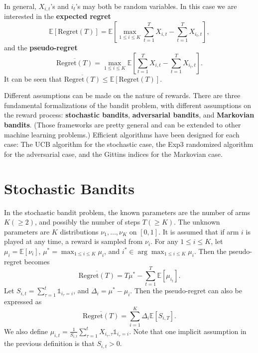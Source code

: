 \documentclass[openany]{book}
\theoremstyle{definition}
\theoremstyle{remark}
\begin{document}
In general, $X_{i,t}$'s and $i_t$'s may both be random variables. In this case we are interested in the \textbf{expected regret}
\begin{equation}\label{expectedRegret}
    \mathbb{E}[\mathrm{Regret}(T)]=\mathbb{E}\left[\max_{1\le i\le K}\sum_{t=1}^{T}X_{i,t}-\sum_{t=1}^{T}X_{i_t,t}\right],
\end{equation}
and the \textbf{pseudo-regret}
\begin{equation}\label{pseudoRegret}
    \overline{\mathrm{Regret}(T)}=\max_{1\le i\le K}\mathbb{E}\left[\sum_{t=1}^{T}X_{i,t}-\sum_{t=1}^{T}X_{i_t,t}\right].
\end{equation}
It can be seen that $\overline{\mathrm{Regret}(T)}\le \mathbb{E}[\mathrm{Regret}(T)]$.

Different assumptions can be made on the nature of rewards. There are three fundamental formalizations of the bandit problem, with different assumptions on the reward process: \textbf{stochastic bandits}, \textbf{adversarial bandits}, and \textbf{Markovian bandits}. (Those frameworks are pretty general and can be extended to other machine learning problems.) Efficient algorithms have been designed for each case: The UCB algorithm for the stochastic case, the Exp3 randomized algorithm for the adversarial case, and the Gittins indices for the Markovian case.

\chapter{Stochastic Bandits}
In the stochastic bandit problem, the known parameters are the number of arms $K(\ge2)$, and possibly the number of steps $T(\ge K)$. The unknown parameters are $K$ distributions $\nu_1,\ldots,\nu_K$ on $[0,1]$. It is assumed that if arm $i$ is played at any time, a reward is sampled from $\nu_i$. For any $1\le i\le K$, let $\mu_i=\mathbb{E}[\nu_i]$, $\mu^*=\max_{1\le i\le K}\mu_i$, and $i^*\in\arg\max_{1\le i\le K}\mu_i$. Then the pseudo-regret becomes
\begin{equation}\label{stochPseudoRegret}
    \overline{\mathrm{Regret}(T)}=T\mu^*-\sum_{t=1}^{T}\mathbb{E}[\mu_{i_t}].
\end{equation}
Let $S_{i,t}=\sum_{\tau=1}^{t}\mathds{1}_{i_{\tau}=i}$, and $\Delta_i=\mu^*-\mu_i$. Then the pseudo-regret can also be expressed as
\begin{equation}\label{stochPseudoRegretAlt}
    \overline{\mathrm{Regret}(T)}=\sum_{i=1}^{K}\Delta_i \mathbb{E}[S_{i,T}].
\end{equation}
We also define $\mu_{i,t}=\frac{1}{S_{i,t}}\sum_{\tau=1}^{t}X_{i_{\tau},\tau}\mathds{1}_{i_{\tau}=i}$. Note that one implicit assumption in the previous definition is that $S_{i,t}>0$.
\end{document}
